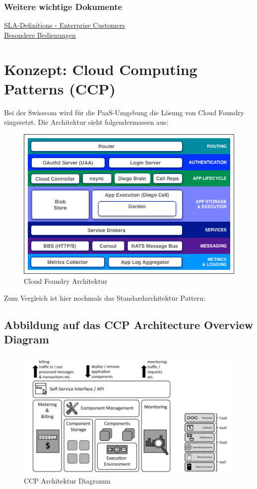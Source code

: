 \subsection{Weitere wichtige Dokumente}
\href{"https://developer.swisscom.com/terms/SLADefinitions-en.pdf"}{SLA-Definitions - Enterprise Customers}\\
\href{"https://www.swisscom.ch/content/dam/swisscom/de/biz/sme/mykmuoffice/pdf/SLA_Besondere_Bedingungen_dt.pdf"}{Besondere Bedienungen}

\chapter{Konzept: Cloud Computing Patterns (CCP)}
Bei der Swisscom wird für die PaaS-Umgebung die Lösung von Cloud Foundry eingesetzt. Die Architektur sieht folgendermassen aus:
\begin{figure}[H]
\centering
\includegraphics[scale=0.45]{images/ccp/cloudfoundry.png}
\caption{Cloud Foundry Architektur}
\end{figure}
Zum Vergleich ist hier nochmals das Standardarchitektur Pattern:
\section{Abbildung auf das CCP Architecture Overview Diagram}
\begin{figure}[H]
\centering
\includegraphics[scale=0.4]{images/ccp/ccp.png}
\caption{CCP Architektur Diagramm}
\end{figure}
